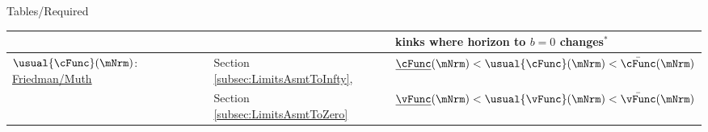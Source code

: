 \documentclass[\econtexRoot/BufferStockTheory]{subfiles}
\providecommand{\TblName}{}
\renewcommand{\TblName}{Required}
\begin{document}
\begin{verbatimwrite}{Tables/\TblName}
\begin{table}
{\begin{tabular}{|l|l|l|}
        \\                                                                                                                        &                                         & kinks where horizon to $b=0$ changes$^{\ast}$
        \\ \hline\hline \multicolumn{1}{|l|}{$\usual{\cFunc}(\mNrm)$:  \hyperlink{Uncertainty-Modified-Conditions}{Friedman/Muth}
        }                                                                                                                       & Section \ref{subsec:LimitsAsmtToInfty}, & $\underline{\cFunc}(\mNrm) < \usual{\cFunc}(\mNrm) < \bar{\cFunc}(\mNrm)$ %
        \\                                                                                                                      & Section \ref{subsec:LimitsAsmtToZero}   & $\underline{\vFunc}(\mNrm) < \usual{\vFunc}(\mNrm) < \bar{\vFunc}(\mNrm)$ %
                                                                                                                                                                       

\end{tabular}}
\end{table}
\end{verbatimwrite}
\end{document}
